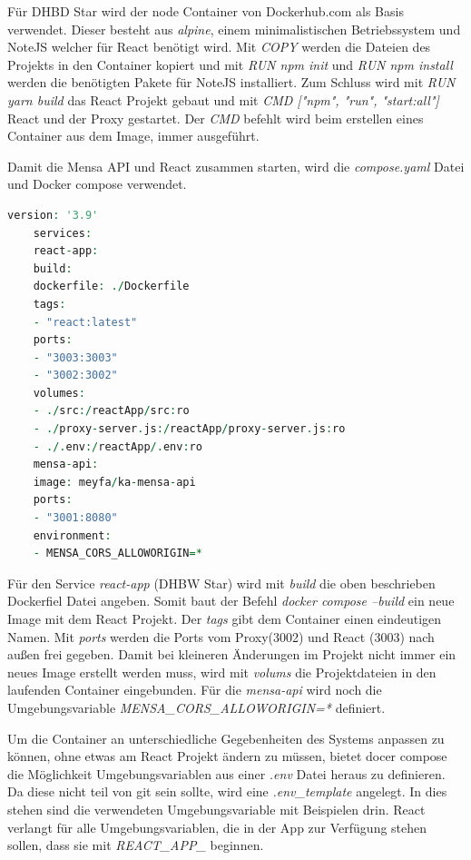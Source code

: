 Für DHBD Star wird der node Container von Dockerhub.com als Basis verwendet. Dieser besteht aus \emph{alpine}, einem minimalistischen Betriebssystem und NoteJS welcher für React benötigt wird.
Mit \emph{COPY} werden die Dateien des Projekts in den Container kopiert und mit \emph{RUN npm init} und \emph{RUN npm install} werden die benötigten Pakete für NoteJS installiert.
Zum Schluss wird mit \emph{RUN yarn build} das React Projekt gebaut und mit \emph{CMD ["npm", "run", "start:all"]} React und der Proxy gestartet. Der \emph{CMD} befehlt wird beim erstellen eines Container aus dem Image, immer ausgeführt. 

Damit die Mensa API und React zusammen starten, wird die \emph{compose.yaml} Datei und Docker compose verwendet.

\begin{lstlisting}[language=vhdl,
	frame=single,           % Ein Rahmen um den Code
	framexleftmargin=15pt,  % Rahmen link von den Zahlen
	style=algoBericht,
	label={Dockerfile},
	captionpos=b           % Caption unter den Code setzen
	caption={compose.yaml für DHBW-Star}]
	version: '3.9'
	services:
	react-app:
	build:
	dockerfile: ./Dockerfile
	tags:
	- "react:latest"
	ports:
	- "3003:3003"
	- "3002:3002"
	volumes:
	- ./src:/reactApp/src:ro
	- ./proxy-server.js:/reactApp/proxy-server.js:ro
	- ./.env:/reactApp/.env:ro
	mensa-api:
	image: meyfa/ka-mensa-api
	ports:
	- "3001:8080"
	environment:
	- MENSA_CORS_ALLOWORIGIN=*
\end{lstlisting}

Für den Service \emph{react-app} (DHBW Star) wird mit \emph{build} die oben beschrieben Dockerfiel Datei angeben. Somit baut der Befehl \emph{docker compose --build} ein neue Image mit dem React Projekt.
Der \emph{tags} gibt dem Container einen eindeutigen Namen.
Mit \emph{ports} werden die Ports vom Proxy(3002) und React (3003) nach außen frei gegeben.
Damit bei kleineren Änderungen im Projekt nicht immer ein neues Image erstellt werden muss, wird mit \emph{volums} die Projektdateien in den laufenden Container eingebunden.
Für die \emph{mensa-api} wird noch die Umgebungsvariable \emph{MENSA\_CORS\_ALLOWORIGIN=*} definiert.

Um die Container an unterschiedliche Gegebenheiten des Systems anpassen zu können, ohne etwas am React Projekt ändern zu müssen, bietet docer compose die Möglichkeit Umgebungsvariablen aus einer \emph{.env} Datei heraus zu definieren.
Da diese nicht teil von git sein sollte, wird eine \emph{.env\_template} angelegt. In dies stehen sind die verwendeten Umgebungsvariable mit Beispielen drin.
React verlangt für alle Umgebungsvariablen, die in der App zur Verfügung stehen sollen, dass sie mit \emph{REACT\_APP\_} beginnen.

